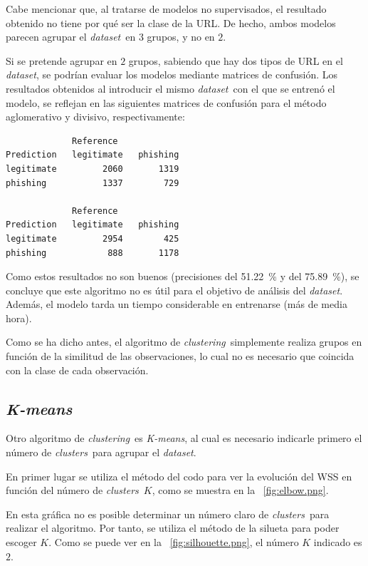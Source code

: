 \documentclass[12pt, a4paper]{article}
\renewcommand{\textit}{\textsl}
\newcommand*{\figref}[1]{\figurename~\ref{fig:#1}}
\newcommand*{\clusters}{\textit{clusters}}
\newcommand*{\clustering}{\textit{clustering}}
\newcommand*{\dataset}{\textit{dataset}}
\newcommand*{\kmeans}{\textit{K-means}}
\begin{document}
      Cabe mencionar que, al tratarse de modelos no supervisados, el resultado obtenido no tiene por qué ser la clase de la URL. De hecho, ambos modelos parecen agrupar el \dataset\ en $3$ grupos, y no en $2$.

      Si se pretende agrupar en $2$ grupos, sabiendo que hay dos tipos de URL en el \dataset, se podrían evaluar los modelos mediante matrices de confusión. Los resultados obtenidos al introducir el mismo \dataset\ con el que se entrenó el modelo, se reflejan en las siguientes matrices de confusión para el método aglomerativo y divisivo, respectivamente:

      \begin{verbatim}
             Reference
Prediction   legitimate   phishing
legitimate         2060       1319
phishing           1337        729

             Reference
Prediction   legitimate   phishing
legitimate         2954        425
phishing            888       1178
      \end{verbatim}

      Como estos resultados no son buenos (precisiones del \SI{51.22}{\percent} y del \SI{75.89}{\percent}), se concluye que este algoritmo no es útil para el objetivo de análisis del \dataset. Además, el modelo tarda un tiempo considerable en entrenarse (más de media hora).

      Como se ha dicho antes, el algoritmo de \clustering\ simplemente realiza grupos en función de la similitud de las observaciones, lo cual no es necesario que coincida con la clase de cada observación.

    \subsection{\kmeans}

      Otro algoritmo de \clustering\ es \kmeans, al cual es necesario indicarle primero el número de \clusters\ para agrupar el \dataset.

      En primer lugar se utiliza el método del codo para ver la evolución del WSS en función del número de \clusters\ $K$, como se muestra en la \figref{elbow.png}.

      En esta gráfica no es posible determinar un número claro de \clusters\ para realizar el algoritmo. Por tanto, se utiliza el método de la silueta para poder escoger $K$. Como se puede ver en la \figref{silhouette.png}, el número $K$ indicado es $2$.
\end{document}
